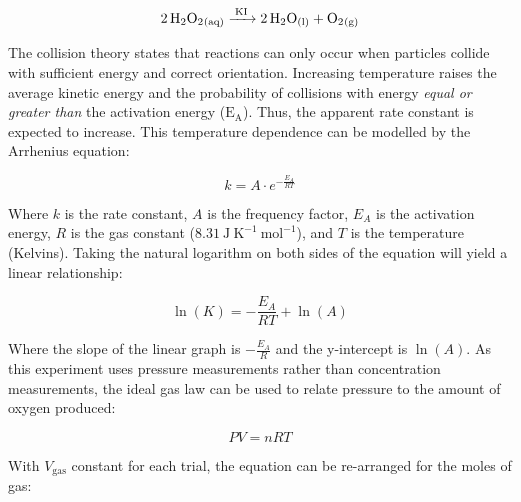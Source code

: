 \documentclass[hyphens]{article}
\begin{document}
\begin{equation}
  \ce{2H2O2_{(aq)} ->[\ce{KI}] 2H2O_{(l)} + O2_{(g)}}
\end{equation}

The collision theory states that reactions can only occur when particles collide with sufficient energy and correct orientation. Increasing temperature raises the average kinetic energy and the probability of collisions with energy \textit{equal or greater than} the activation energy ($\text{E}_\text{A}$). Thus, the apparent rate constant is expected to increase. This temperature dependence can be modelled by the Arrhenius equation:

\begin{equation}
  k = A \cdot e^{- \frac{E_{A}}{RT}}
\label{eq:arrhenius-equation}
\end{equation}

\noindent Where $k$ is the rate constant, $A$ is the frequency factor, $E_{A}$ is the activation energy, $R$ is the gas constant ($8.31\ \text{J}\ \text{K}^{-1}\ \text{mol}^{-1}$), and $T$ is the temperature (Kelvins). Taking the natural logarithm on both sides of the equation will yield a linear relationship:

\begin{equation}
  \ln{(K)} = - \frac{E_{A}}{RT} + \ln{(A)}
\end{equation}

\noindent Where the slope of the linear graph is $- \frac{E_{A}}{R}$ and the y-intercept is $\ln{(A)}$. As this experiment uses pressure measurements rather than concentration measurements, the ideal gas law can be used to relate pressure to the amount of oxygen produced:


\begin{equation}
  PV = nRT
\end{equation}

\noindent With $V_\text{gas}$ constant for each trial, the equation can be re-arranged for the moles of gas:
\end{document}
